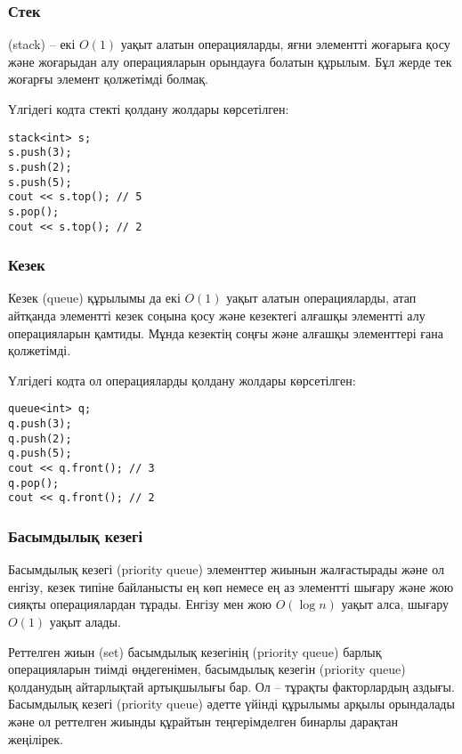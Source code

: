 \subsubsection{Стек}


 (stack)
-- екі $O(1)$ уақыт алатын операцияларды, яғни элементті жоғарыға қосу және жоғарыдан алу 
операцияларын орындауға болатын құрылым.
Бұл жерде тек жоғарғы элемент қолжетімді болмақ.

Үлгідегі кодта стекті қолдану жолдары көрсетілген:
\begin{lstlisting}
stack<int> s;
s.push(3);
s.push(2);
s.push(5);
cout << s.top(); // 5
s.pop();
cout << s.top(); // 2
\end{lstlisting}
\subsubsection{Кезек}


Кезек (queue) құрылымы да екі $O(1)$ уақыт алатын операцияларды, атап айтқанда 
элементті кезек соңына қосу  және кезектегі алғашқы 
элементті алу операцияларын қамтиды.
Мұнда кезектің соңғы және алғашқы элементтері ғана қолжетімді.

Үлгідегі кодта ол операцияларды қолдану жолдары көрсетілген:
\begin{lstlisting}
queue<int> q;
q.push(3);
q.push(2);
q.push(5);
cout << q.front(); // 3
q.pop();
cout << q.front(); // 2
\end{lstlisting}

\subsubsection{Басымдылық кезегі}


Басымдылық кезегі (priority queue) элементтер жиынын жалғастырады және ол енгізу, кезек типіне байланысты
ең көп немесе ең аз элементті шығару және жою сияқты операциялардан тұрады.  
Енгізу мен жою $O(\log n)$ уақыт алса, шығару $O(1)$ уақыт алады.

Реттелген жиын (set) басымдылық кезегінің (priority queue) барлық операцияларын тиімді өңдегенімен,
басымдылық кезегін (priority queue) қолданудың айтарлықтай артықшылығы бар. Ол -- тұрақты факторлардың аздығы.
Басымдылық кезегі (priority queue) әдетте үйінді құрылымы арқылы орындалады және 
ол реттелген жиынды құрайтын теңгерімделген бинарлы дарақтан жеңілірек.

